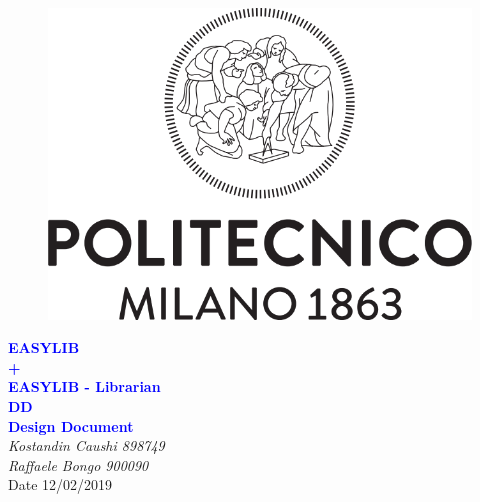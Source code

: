 


	\begin{titlepage}
		\centering
		\begin{figure}
			\vspace*{0mm}
			\centering
			\includegraphics[scale=0.3]{Images/Polimi_Logo}
			\\[3cm]
		\end{figure}		
		\vspace{65mm}
		\textcolor{Blue}{\textbf{\huge EASYLIB \\\vspace{2mm} + \\\vspace{5mm} EASYLIB - Librarian}}\\[15mm]
		\textcolor{Blue}{\textbf{\huge DD}}\\[4mm]
		{\textcolor{Blue}{\textbf{\Large{Design Document}}}}\\
		\vspace{30mm}
		\textit{\large Kostandin Caushi 898749}\\[3mm]
		\textit{\large Raffaele Bongo 900090}\\[3mm]
		\vspace{30mm}
		Date 12/02/2019
	\end{titlepage}

	\begin{center}
	\vspace*{-5mm}
	\renewcommand{\contentsname}{Table of Contents}
	\tableofcontents
	\newpage
	\listoffigures
	\newpage
    \end{center}
	
	\ttfamily
	\setlength{\emergencystretch}{45pt}
	
	\newpage
	
	\newpage
	
	\newpage
	
	\newpage
	
	\newpage
	

